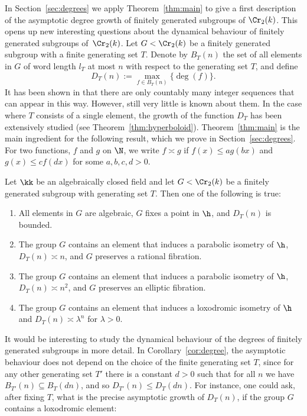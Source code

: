 In Section~\ref{sec:degrees} we apply Theorem~\ref{thm:main} to give a first description of the asymptotic degree growth of finitely generated subgroups of $\Cr_2(k)$. This opens up new interesting questions about the dynamical behaviour of finitely generated subgroups of~$\Cr_2(k)$. Let $G<\Cr_2(k)$ be a finitely generated subgroup with a finite generating set $T$. Denote by $B_T(n)$ the set of all elements in $G$ of word length $l_T$ at most $n$ with respect to the generating set $T$, and define
\[
D_{T}(n):=\max_{f\in B_T(n)}\{\deg(f)\}.
\]
It has been shown in \cite{MR3818624} that there are only countably many integer sequences that can appear in this way. However, still very little is known about them. In the case where $T$ consists of a single element, the growth of the function $D_T$ has been {extensively} studied (see Theorem~\ref{thm:hyperboloid}). Theorem~\ref{thm:main} is the main ingredient for the following result, which we prove in Section~\ref{sec:degrees}. For two functions, $f$ and $g$ on $\N$, we write $f\asymp g$ if $f(x)\leq ag(bx)$ and $g(x)\leq cf(dx)$ for some $a,b,c,d>0$.
\begin{corollary}\label{cor:degree}
Let $\kk$ be an algebraically closed field and let $G<\Cr_2(k)$ be a finitely generated subgroup with generating set $T$. Then one of the following is true:
\begin{enumerate}
\item All elements in $G$ are algebraic, $G$ fixes a point in $\h$, and $D_T(n)$ is bounded.
\item[(2a)] The group $G$ contains an element that induces a parabolic isometry of $\h$, $D_T(n)\asymp n$, and $G$ preserves a rational fibration.
\item[(2b)] The group $G$ contains an element that induces a parabolic isometry of $\h$, $D_T(n)\asymp n^2$, and $G$ preserves an elliptic fibration.
\item[(3)] The group $G$ contains an element that induces a loxodromic isometry of $\h$ and $D_T(n)\asymp\lambda^n$ for $\lambda>0$.
\end{enumerate}
\end{corollary}

It would be interesting to study the dynamical behaviour of the degrees of finitely generated subgroups in more detail. In Corollary~\ref{cor:degree}, the asymptotic behaviour does not depend on the choice of the finite generating set $T$, {since for any other generating set $T'$ there is a constant $d>0$ such that for all $n$ we have $B_{T'}(n)\subseteq B_T(dn)$, and so $D_{T'}(n)\leq D_{T}(dn)$.} For instance, one could ask, after fixing $T$, what is the precise asymptotic growth of $D_T(n)$, if the group $G$ contains a loxodromic element:

